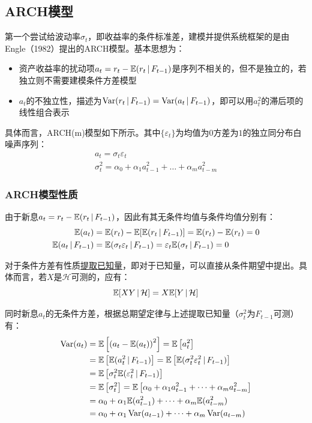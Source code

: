 \documentclass[11pt]{article}
\begin{document}
\subsection{ARCH模型}

第一个尝试给波动率$\sigma_t$，即收益率的条件标准差，建模并提供系统框架的是由Engle（1982）提出的ARCH模型。基本思想为：
\begin{itemize}
    \item 资产收益率的扰动项$a_t = r_t - \mathbb{E}(r_t \,\vert\, F_{t-1})$是序列不相关的，但不是独立的，若独立则不需要建模条件方差模型
    \item $a_t$的不独立性，描述为$\operatorname{Var}(r_t \,\vert\, F_{t-1}) = \operatorname{Var}(a_t \,\vert\, F_{t-1})$，即可以用$a_{t}^{2}$的滞后项的线性组合表示
\end{itemize}

具体而言，ARCH(m)模型如下所示。其中$\{\varepsilon_t\}$为均值为$0$方差为$1$的独立同分布白噪声序列：
\begin{gather*}
    a_t = \sigma_t \varepsilon_t \\
    \sigma_t^2 = \alpha_0 + \alpha_1 a_{t-1}^2 + \dots + \alpha_m a_{t-m}^2
\end{gather*}

\subsubsection{ARCH模型性质}

由于新息$a_t = r_t - \mathbb{E}(r_t \,\vert\, F_{t-1})$，因此有其无条件均值与条件均值分别有：
\begin{align*}
    \mathbb{E}(a_t) &= \mathbb{E}(r_t) - \mathbb{E}[\mathbb{E}(r_t \,\vert\, F_{t-1})] = \mathbb{E}(r_t) - \mathbb{E}(r_t) = 0 \\
    \mathbb{E}(a_t \,\vert\, F_{t-1}) &= \mathbb{E}(\sigma_t \varepsilon_t \,\vert\, F_{t-1}) = \varepsilon_t \mathbb{E}(\sigma_t \,\vert\, F_{t-1}) = 0
\end{align*}

对于条件方差有性质\uline{提取已知量}，即对于已知量，可以直接从条件期望中提出。具体而言，若$X$是$\mathcal{H}$可测的，应有：
\begin{equation*}
    \mathbb{E}[X Y\,\vert\, \mathcal{H}] = X \mathbb{E}[Y \,\vert\, \mathcal{H}] 
\end{equation*}

同时新息$a_t$的无条件方差，根据总期望定律与上述提取已知量（$\sigma_{t}^{2}$为$F_{t-1}$可测）有：
\begin{align*}
    \operatorname{Var}(a_t) &= \mathbb{E}\left[\left(a_t - \mathbb{E}(a_t)\right)^2\right]
    = \mathbb{E}\left[ a_t^2 \right] \\
    &= \mathbb{E}\left[ \mathbb{E}(a_t^2 \,\vert\, F_{t-1}) \right]
    = \mathbb{E}\left[ \mathbb{E}(\sigma_t^2 \varepsilon_t^2 \,\vert\, F_{t-1}) \right] \\
    &= \mathbb{E}\left[ \sigma_t^2 \mathbb{E}( \varepsilon_t^2 \,\vert\, F_{t-1}) \right] \\
    &= \mathbb{E}\left[ \sigma_t^2 \right] = \mathbb{E} \left[ \alpha_0 + \alpha_1 a_{t-1}^2 + \dots + \alpha_m a_{t-m}^{2} \right] \\
    &= \alpha_0 + \alpha_1 \mathbb{E}(a_{t-1}^{2}) + \dots + \alpha_m \mathbb{E}(a_{t-m}^{2}) \\
    &= \alpha_0 + \alpha_1 \operatorname{Var}(a_{t-1}) + \dots + \alpha_m \operatorname{Var}(a_{t-m})
\end{align*}
\end{document}
